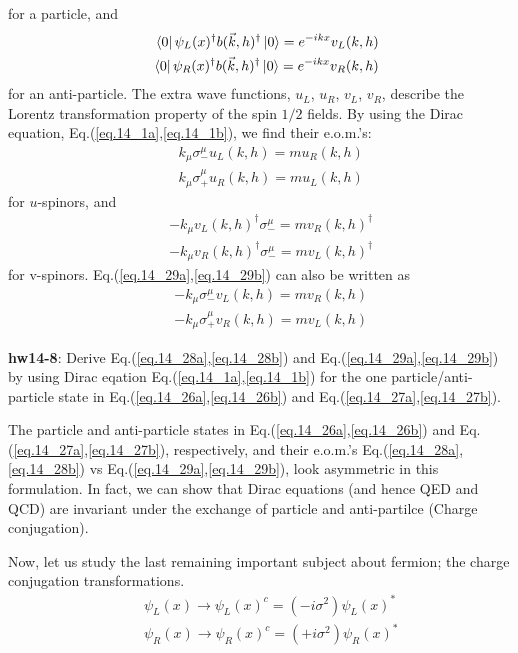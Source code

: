 \documentclass[12pt]{article}
\begin{document}
  for a particle, and
  \begin{eqnarray}
   && \bra{0} \psi_L(x)^\dagger b({\vec k},h)^\dagger \ket{0}=e^{-ikx} v_L(k,h)\label{eq.14_27a} \\
    &&\bra{0} \psi_R(x)^\dagger b({\vec k},h)^\dagger \ket{0}=e^{-ikx} v_R(k,h)\label{eq.14_27b}
  \end{eqnarray}
  for an anti-particle. The extra wave functions, $u_L$, $u_R$, $v_L$, $v_R$,
  describe the Lorentz transformation property of the spin $1/2$ fields.
  By using the Dirac equation, Eq.(\ref{eq.14_1a},\ref{eq.14_1b}), we find their e.o.m.'s:
\begin{eqnarray}
  &&k_\mu \sigma_-^\mu u_L(k,h) = m u_R(k,h) \label{eq.14_28a} \\
  && k_\mu \sigma_+^\mu u_R(k,h) = m u_L(k,h) \label{eq.14_28b}
\end{eqnarray}
  for $u$-spinors, and
\begin{eqnarray}
  && -k_\mu v_L(k,h)^\dagger \sigma_-^\mu = m v_R(k,h)^\dagger \label{eq.14_29a} \\
  && -k_\mu v_R(k,h)^\dagger \sigma_-^\mu = m v_L(k,h)^\dagger \label{eq.14_29b}
\end{eqnarray}
  for v-spinors.  Eq.(\ref{eq.14_29a},\ref{eq.14_29b}) can also be written as
\begin{eqnarray}
  &&-k_\mu \sigma_-^\mu v_L(k,h) = m v_R(k,h) \label{eq.14_29c}\\
  && -k_\mu \sigma_+^\mu v_R(k,h) = m v_L(k,h) \label{eq.14_29d}
\end{eqnarray}

{\bf hw14-8}: Derive Eq.(\ref{eq.14_28a},\ref{eq.14_28b}) and Eq.(\ref{eq.14_29a},\ref{eq.14_29b}) by using Dirac eqation Eq.(\ref{eq.14_1a},\ref{eq.14_1b}) for the one particle/anti-particle state in Eq.(\ref{eq.14_26a},\ref{eq.14_26b}) and Eq.(\ref{eq.14_27a},\ref{eq.14_27b}).

  The particle and anti-particle states in Eq.(\ref{eq.14_26a},\ref{eq.14_26b}) and Eq.(\ref{eq.14_27a},\ref{eq.14_27b}), respectively,
  and their e.o.m.'s Eq.(\ref{eq.14_28a},\ref{eq.14_28b}) vs Eq.(\ref{eq.14_29a},\ref{eq.14_29b}), look asymmetric in this formulation.
  In fact, we can show that Dirac equations (and hence QED and QCD)
  are invariant under the exchange of particle and anti-partilce
  (Charge conjugation).

  Now, let us study the last remaining important subject about fermion;
  the charge conjugation transformations.
\begin{eqnarray}
  && \psi_L(x) \to \psi_L(x)^c = (-i\sigma^2) \psi_L(x)^* \label{eq.14_30a}\\
  && \psi_R(x) \to \psi_R(x)^c = (+i\sigma^2) \psi_R(x)^* \label{eq.14_30b}
\end{eqnarray}
  
\end{document}
